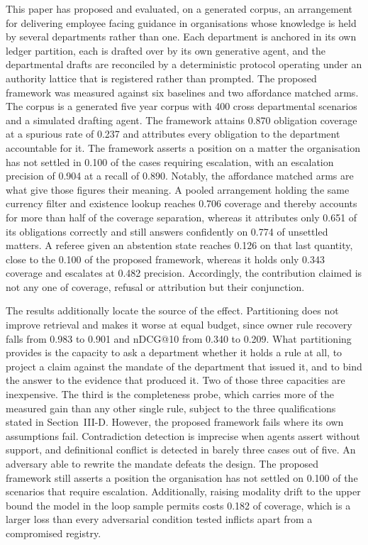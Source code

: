 \documentclass[journal]{IEEEtran}
\begin{document}
This paper has proposed and evaluated, on a generated corpus, an arrangement for delivering employee facing guidance in organisations whose knowledge is held by several departments rather than one. Each department is anchored in its own ledger partition, each is drafted over by its own generative agent, and the departmental drafts are reconciled by a deterministic protocol operating under an authority lattice that is registered rather than prompted. The proposed framework was measured against six baselines and two affordance matched arms. The corpus is a generated five year corpus with 400 cross departmental scenarios and a simulated drafting agent. The framework attains 0.870 obligation coverage at a spurious rate of 0.237 and attributes every obligation to the department accountable for it. The framework asserts a position on a matter the organisation has not settled in 0.100 of the cases requiring escalation, with an escalation precision of 0.904 at a recall of 0.890. Notably, the affordance matched arms are what give those figures their meaning. A pooled arrangement holding the same currency filter and existence lookup reaches 0.706 coverage and thereby accounts for more than half of the coverage separation, whereas it attributes only 0.651 of its obligations correctly and still answers confidently on 0.774 of unsettled matters. A referee given an abstention state reaches 0.126 on that last quantity, close to the 0.100 of the proposed framework, whereas it holds only 0.343 coverage and escalates at 0.482 precision. Accordingly, the contribution claimed is not any one of coverage, refusal or attribution but their conjunction.

The results additionally locate the source of the effect. Partitioning does not improve retrieval and makes it worse at equal budget, since owner rule recovery falls from 0.983 to 0.901 and nDCG@10 from 0.340 to 0.209. What partitioning provides is the capacity to ask a department whether it holds a rule at all, to project a claim against the mandate of the department that issued it, and to bind the answer to the evidence that produced it. Two of those three capacities are inexpensive. The third is the completeness probe, which carries more of the measured gain than any other single rule, subject to the three qualifications stated in Section~III-D. However, the proposed framework fails where its own assumptions fail. Contradiction detection is imprecise when agents assert without support, and definitional conflict is detected in barely three cases out of five. An adversary able to rewrite the mandate defeats the design. The proposed framework still asserts a position the organisation has not settled on 0.100 of the scenarios that require escalation. Additionally, raising modality drift to the upper bound the model in the loop sample permits costs 0.182 of coverage, which is a larger loss than every adversarial condition tested inflicts apart from a compromised registry.
\end{document}
